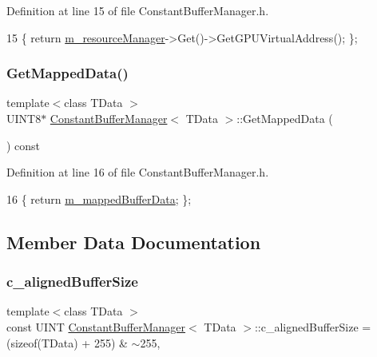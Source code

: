 Definition at line 15 of file Constant\+Buffer\+Manager.\+h.


\begin{DoxyCode}
15 \{ \textcolor{keywordflow}{return} \mbox{\hyperlink{class_constant_buffer_manager_a8302ee559cb53baaf2233fcb20b867b4}{m\_resourceManager}}->Get()->GetGPUVirtualAddress(); \};
\end{DoxyCode}
\mbox{\label{class_constant_buffer_manager_a431be2aa715a8605587a5aed489ffff8}} 
\subsubsection{\texorpdfstring{Get\+Mapped\+Data()}{GetMappedData()}}
{\footnotesize\ttfamily template$<$class T\+Data $>$ \\
U\+I\+N\+T8$\ast$ \mbox{\hyperlink{class_constant_buffer_manager}{Constant\+Buffer\+Manager}}$<$ T\+Data $>$\+::Get\+Mapped\+Data (\begin{DoxyParamCaption}{ }\end{DoxyParamCaption}) const\hspace{0.3cm}{\ttfamily [inline]}}



Definition at line 16 of file Constant\+Buffer\+Manager.\+h.


\begin{DoxyCode}
16 \{ \textcolor{keywordflow}{return} \mbox{\hyperlink{class_constant_buffer_manager_a35b50fb75b21a3b98adca908b5c144c6}{m\_mappedBufferData}}; \};
\end{DoxyCode}


\subsection{Member Data Documentation}
\mbox{\label{class_constant_buffer_manager_ac646a2089c56b988b2bac5aa9a1de723}} 
\subsubsection{\texorpdfstring{c\+\_\+aligned\+Buffer\+Size}{c\_alignedBufferSize}}
{\footnotesize\ttfamily template$<$class T\+Data $>$ \\
const U\+I\+NT \mbox{\hyperlink{class_constant_buffer_manager}{Constant\+Buffer\+Manager}}$<$ T\+Data $>$\+::c\+\_\+aligned\+Buffer\+Size = (sizeof(T\+Data) + 255) \& $\sim$255\hspace{0.3cm}{\ttfamily [static]}, {\ttfamily [private]}}



